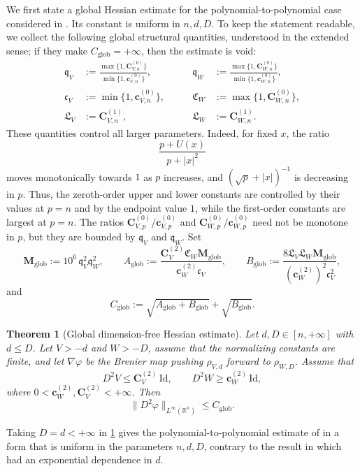 \documentclass[11pt,a4paper,reqno]{amsart}
\numberwithin{equation}{section}
\newtheorem{theorem}{Theorem}[section]
\theoremstyle{definition}
\newcommand{\<}{\ensuremath \leq}
\renewcommand{\>}{\ensuremath \geq}
\newcommand{\CV}{\mathbf{C}_V}
\newcommand{\cW}{\mathbf{c}_W}
\newcommand{\CVp}[1]{\mathbf{C}_{V,#1}}
\newcommand{\CWp}[1]{\mathbf{C}_{W,#1}}
\newcommand{\cVp}[1]{\mathbf{c}_{V,#1}}
\newcommand{\cWp}[1]{\mathbf{c}_{W,#1}}
\begin{document}
We first state a global Hessian estimate for the polynomial-to-polynomial case considered in \cite{Alessio_Carlier_Santa}. Its constant is uniform in $n,d,D$. To keep the statement readable, we collect the following global structural quantities, understood in the extended sense; if they make $C_{\mathrm{glob}}=+\infty$, then the estimate is void:
\[
\begin{aligned}
\mathfrak q_V&:=
\frac{\max\{1,\CVp{n}^{(0)}\}}{\min\{1,\cVp{n}^{(0)}\}},
\qquad&
\mathfrak q_W&:=
\frac{\max\{1,\CWp{n}^{(0)}\}}{\min\{1,\cWp{n}^{(0)}\}},\\[0.8em]
\mathfrak c_V&:=\min\{1,\cVp{n}^{(0)}\},
\qquad&
\mathfrak C_W&:=\max\{1,\CWp{n}^{(0)}\},\\[0.8em]
\mathfrak L_V&:=\CVp{n}^{(1)},
\qquad&
\mathfrak L_W&:=\CWp{n}^{(1)}.
\end{aligned}
\]
These quantities control all larger parameters. Indeed, for fixed $x$, the ratio
\[
    \frac{p+U(x)}{p+|x|^2}
\]
moves monotonically towards $1$ as $p$ increases, and $(\sqrt p+|x|)^{-1}$ is decreasing in $p$. Thus, the zeroth-order upper and lower constants are controlled by their values at $p=n$ and by the endpoint value $1$, while the first-order constants are largest at $p=n$. The ratios $\CVp{p}^{(0)}/\cVp{p}^{(0)}$ and $\CWp{p}^{(0)}/\cWp{p}^{(0)}$ need not be monotone in $p$, but they are bounded by $\mathfrak q_V$ and $\mathfrak q_W$.
Set
\[
\mathbf M_{\mathrm{glob}}:= 10^6\,\mathfrak q_V^2\mathfrak q_W^2,\qquad
A_{\mathrm{glob}}
:=
\frac{\CV^{(2)}\mathfrak C_W\mathbf M_{\mathrm{glob}}}
{\cW^{(2)}\mathfrak c_V},\qquad 
B_{\mathrm{glob}}
:=
\frac{8\mathfrak L_V\mathfrak L_W\mathbf M_{\mathrm{glob}}}
{(\cW^{(2)})^2\mathfrak c_V^2},
\]
and
\[
    C_{\mathrm{glob}}
    :=
    \sqrt{A_{\mathrm{glob}}+B_{\mathrm{glob}}}
    +\sqrt{B_{\mathrm{glob}}}.
\]

\begin{theorem}[Global dimension-free Hessian estimate]\label{Intro_global_theorem}
Let $d,D\in[n,+\infty]$ with $d\le D$. Let $V>-d$ and $W>-D$, assume that the normalizing constants are finite, and let $\nabla\varphi$ be the Brenier map pushing $\rho_{V,d}$ forward to $\rho_{W,D}$. Assume that
\[
    D^2V\le \CV^{(2)}\,\mathrm{Id}, \qquad
    D^2W\ge \cW^{(2)}\,\mathrm{Id},
\]
where $0<\cW^{(2)},\CV^{(2)}<+\infty$.
Then
\[
    \|D^2\varphi\|_{L^\infty(\mathbb{R}^n)}
    \le
    C_{\mathrm{glob}}.
\]
\end{theorem}

Taking $D=d<+\infty$ in \cref{Intro_global_theorem} gives the polynomial-to-polynomial estimate of \cite{Alessio_Carlier_Santa} in a form that is uniform in the parameters $n,d,D$, contrary to the result in \cite{Alessio_Carlier_Santa} which had an exponential dependence in $d$.
\end{document}
